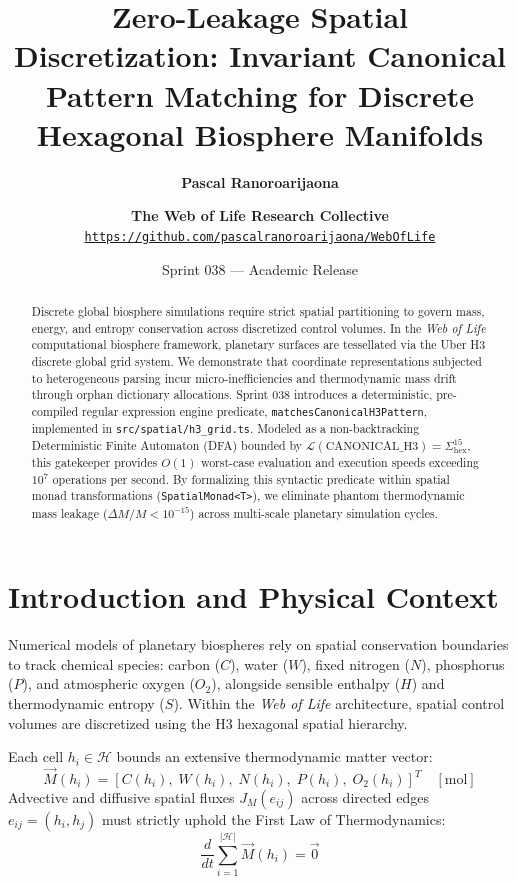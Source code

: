 \documentclass[11pt,a4paper]{article}
\title{\textbf{Zero-Leakage Spatial Discretization: Invariant Canonical Pattern Matching for Discrete Hexagonal Biosphere Manifolds}}
\author{
    \textbf{Pascal Ranoroarijaona} \and \textbf{The Web of Life Research Collective} \\
    \texttt{\url{https://github.com/pascalranoroarijaona/WebOfLife}}
}
\date{Sprint 038 --- Academic Release}
\begin{document}
\maketitle

\begin{abstract}
Discrete global biosphere simulations require strict spatial partitioning to govern mass, energy, and entropy conservation across discretized control volumes. In the \emph{Web of Life} computational biosphere framework, planetary surfaces are tessellated via the Uber H3 discrete global grid system. We demonstrate that coordinate representations subjected to heterogeneous parsing incur micro-inefficiencies and thermodynamic mass drift through orphan dictionary allocations. Sprint 038 introduces a deterministic, pre-compiled regular expression engine predicate, \texttt{matchesCanonicalH3Pattern}, implemented in \texttt{src/spatial/h3\_grid.ts}. Modeled as a non-backtracking Deterministic Finite Automaton (DFA) bounded by $\mathcal{L}(\text{CANONICAL\_H3}) = \Sigma_{\text{hex}}^{15}$, this gatekeeper provides $O(1)$ worst-case evaluation and execution speeds exceeding $10^7$ operations per second. By formalizing this syntactic predicate within spatial monad transformations (\texttt{SpatialMonad<T>}), we eliminate phantom thermodynamic mass leakage ($\Delta M / M < 10^{-15}$) across multi-scale planetary simulation cycles.
\end{abstract}

\section{Introduction and Physical Context}

Numerical models of planetary biospheres rely on spatial conservation boundaries to track chemical species: carbon ($C$), water ($W$), fixed nitrogen ($N$), phosphorus ($P$), and atmospheric oxygen ($O_2$), alongside sensible enthalpy ($H$) and thermodynamic entropy ($S$). Within the \emph{Web of Life} architecture, spatial control volumes are discretized using the H3 hexagonal spatial hierarchy.

Each cell $h_i \in \mathcal{H}$ bounds an extensive thermodynamic matter vector:
\begin{equation}
    \vec{M}(h_i) = \left[ C(h_i), \; W(h_i), \; N(h_i), \; P(h_i), \; O_2(h_i) \right]^T \quad [\text{mol}]
\end{equation}
Advective and diffusive spatial fluxes $J_M(e_{ij})$ across directed edges $e_{ij} = (h_i, h_j)$ must strictly uphold the First Law of Thermodynamics:
\begin{equation}
    \frac{d}{dt} \sum_{i=1}^{|\mathcal{H}|} \vec{M}(h_i) = \vec{0}
\end{equation}
\end{document}
